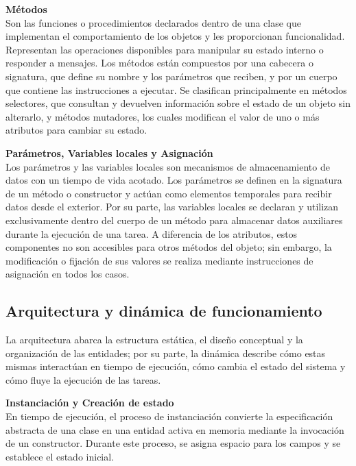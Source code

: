 \noindent\textbf{Métodos} \vspace{0.5em} \\ 
\indent Son las funciones o procedimientos declarados dentro de una clase que 
implementan el comportamiento de los objetos y les proporcionan funcionalidad. 
Representan las operaciones disponibles para manipular su estado interno o 
responder a mensajes. Los métodos están compuestos por una cabecera o signatura, 
que define su nombre y los parámetros que reciben, y por un cuerpo que contiene 
las instrucciones a ejecutar. Se clasifican principalmente en métodos 
selectores, que consultan y devuelven información sobre el estado de un 
objeto sin alterarlo, y métodos mutadores, los cuales modifican el valor de 
uno o más atributos para cambiar su estado.
\vspace{1.5em}

\noindent\textbf{Parámetros, Variables locales y Asignación} \vspace{0.5em} \\ 
\indent Los parámetros y las variables locales son mecanismos de almacenamiento 
de datos con un tiempo de vida acotado. Los parámetros se definen en la 
signatura de un método o constructor y actúan como elementos temporales para 
recibir datos desde el exterior. Por su parte, las variables locales se 
declaran y utilizan exclusivamente dentro del cuerpo de un método para 
almacenar datos auxiliares durante la ejecución de una tarea. A diferencia de 
los atributos, estos componentes no son accesibles para otros métodos del 
objeto; sin embargo, la modificación o fijación de sus valores se realiza 
mediante instrucciones de asignación en todos los casos.

\subsection{Arquitectura y dinámica de funcionamiento}
La arquitectura abarca la estructura estática, el diseño conceptual y la 
organización de las entidades; por su parte, la dinámica describe cómo estas 
mismas interactúan en tiempo de ejecución, cómo cambia el estado del sistema y 
cómo fluye la ejecución de las tareas.
\vspace{1.5em} 


\noindent\textbf{Instanciación y Creación de estado} \vspace{0.5em} \\ 
\indent En tiempo de ejecución, el proceso de instanciación convierte la 
especificación abstracta de una clase en una entidad activa en memoria mediante 
la invocación de un constructor. Durante este proceso, se asigna espacio para 
los campos y se establece el estado inicial.
\vspace{1.5em}

